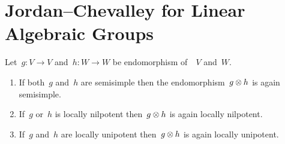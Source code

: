 \section{Jordan--Chevalley for Linear Algebraic Groups}


\begin{lemma}
  \label{properties of tensor product of local endomorphisms}
  Let~$g \colon V \to V$ and~$h \colon W \to W$ be endomorphism of~~$V$ and~$W$.
  \begin{enumerate}
    \item
      If both~$g$ and~$h$ are semisimple then the endomorphism~$g \otimes h$ is again semisimple.
    \item 
      If~$g$ or~$h$ is locally nilpotent then~$g \otimes h$ is again locally nilpotent.
    \item
      If~$g$ and~$h$ are locally unipotent then~$g \otimes h$ is again locally unipotent.
  \end{enumerate}
\end{lemma}



